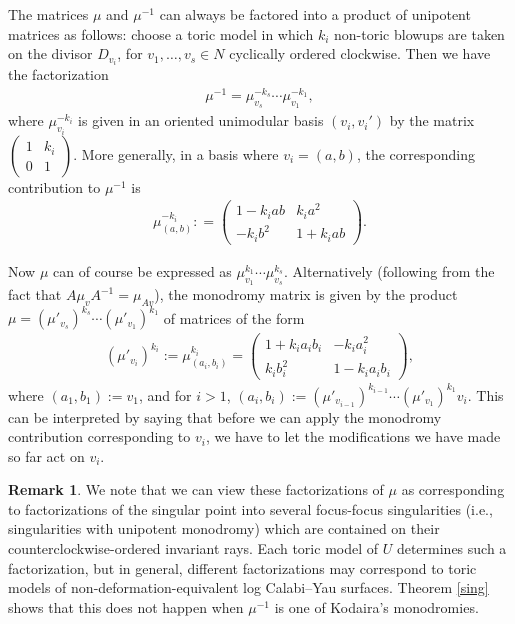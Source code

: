 \documentclass[10pt,a4paper]{amsart}
\numberwithin{equation}{section}
\numberwithin{figure}{section}
\numberwithin{table}{section}
\theoremstyle{definition}
\newtheorem{rmk}[thm]{Remark}
\begin{document}
The matrices $\mu$ and $\mu^{-1}$ can always be factored into a product of unipotent matrices as follows: choose a toric model in which $k_i$ non-toric blowups are taken on the divisor $D_{v_i}$, for $v_1,\dots,v_s\in N$ cyclically ordered clockwise. Then we have the factorization
\begin{align}
	\mu^{-1} = \mu_{v_s}^{-k_s} \cdots \mu_{v_1}^{-k_1},
\end{align}
where $\mu_{v_i}^{-k_i}$ is given in an oriented unimodular basis $(v_i,v_i')$ by the matrix $	\left(\begin{smallmatrix}
		1 &k_i \\
		0 &1
		\end{smallmatrix}\right)$.
 More generally, in a basis where $v_i = (a,b)$, the corresponding contribution to $\mu^{-1}$ is
\begin{gather}\label{genmut}
	\mu_{(a,b)}^{-k_i} :
		= \left(\begin{matrix}
		1- k_i a b &k_i a^2 \\
		-k_i b^2 &1+k_i a b
		\end{matrix}\right).
\end{gather}

Now $\mu$ can of course be expressed as $\mu_{v_1}^{k_1} \cdots \mu_{v_s}^{k_s}$. Alternatively (following from the fact that $A\mu_v A^{-1}=\mu_{Av}$), the monodromy matrix is given by the product $\mu=(\mu'_{v_s})^{k_s} \cdots (\mu'_{v_1})^{k_1}$ of matrices of the form
\begin{align}\label{hardmu}
	(\mu'_{v_i})^{k_i}:=\mu_{(a_i,b_i)}^{k_i}
		= \left(\begin{matrix}
		1+ k_i a_i b_i &-k_i a_i^2 \\
		k_i b_i^2 &1-k_i a_i b_i
		\end{matrix}\right),
\end{align}
where $(a_1,b_1):=v_1$, and for $i>1$, $(a_i,b_i):=(\mu'_{v_{i-1}})^{k_{i-1}}\cdots (\mu'_{v_1})^{k_1} v_i$. This can be interpreted by saying that before we can apply the monodromy contribution corresponding to $v_i$, we have to let the modifications we have made so far act on $v_i$.

\begin{rmk}\label{factor}We note that we can view these factorizations of $\mu$ as corresponding to factorizations of the singular point into several focus-focus singularities (i.e., singularities with unipotent monodromy) which are contained on their counterclockwise-ordered invariant rays. Each toric model of $U$ determines such a factorization, but in general, different factorizations may correspond to toric models of non-deformation-equivalent log Calabi--Yau surfaces. Theorem \ref{sing} shows that this does not happen when $\mu^{-1}$ is one of Kodaira's monodromies.
\end{rmk}
\end{document}
